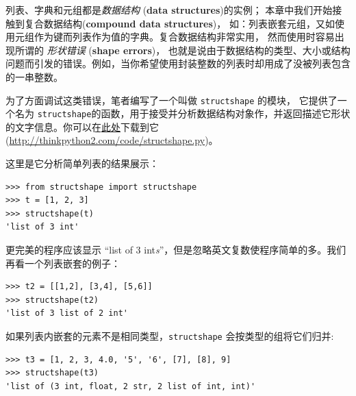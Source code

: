 列表、字典和元组都是{\em 数据结构}  ({\bf data structures})的实例； 本章中我们开始接触到复合数据结构({\bf compound data structures})， 如：列表嵌套元组，又如使用元组作为键而列表作为值的字典。复合数据结构非常实用， 然而使用时容易出现所谓的 {\em 形状错误} ({\bf shape errors})， 也就是说由于数据结构的类型、大小或结构问题而引发的错误。例如，当你希望使用封装整数的列表时却用成了没被列表包含的一串整数。
 


为了方面调试这类错误，笔者编写了一个叫做 \lstinline{structshape} 的模块， 它提供了一个名为 \lstinline{structshape}的函数，用于接受并分析数据结构对象作，并返回描述它形状的文字信息。你可以在\href{http://thinkpython2.com/code/structshape.py}{此处}下载到它(\url{http://thinkpython2.com/code/structshape.py})。


这里是它分析简单列表的结果展示：

\begin{lstlisting}
>>> from structshape import structshape
>>> t = [1, 2, 3]
>>> structshape(t)
'list of 3 int'
\end{lstlisting}

%

更完美的程序应该显示 ``list of 3 int{\em s}''，但是忽略英文复数使程序简单的多。我们再看一个列表嵌套的例子：

\begin{lstlisting}
>>> t2 = [[1,2], [3,4], [5,6]]
>>> structshape(t2)
'list of 3 list of 2 int'
\end{lstlisting}

%

如果列表内嵌套的元素不是相同类型，\lstinline{structshape} 会按类型的组将它们归并:

\begin{lstlisting}
>>> t3 = [1, 2, 3, 4.0, '5', '6', [7], [8], 9]
>>> structshape(t3)
'list of (3 int, float, 2 str, 2 list of int, int)'
\end{lstlisting}

